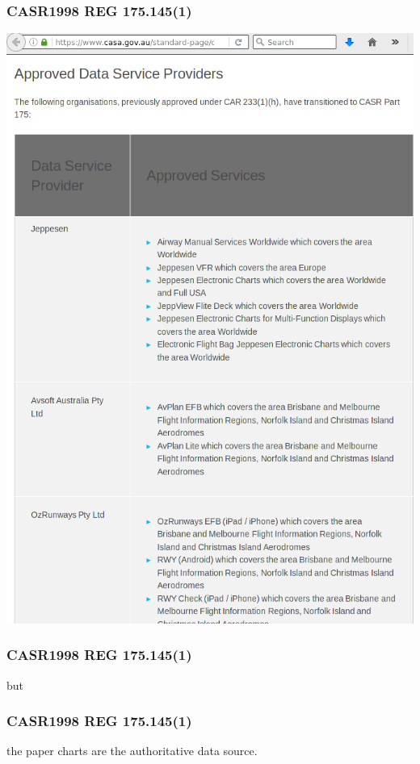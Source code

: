 \begin{frame}
\frametitle{CASR1998 REG 175.145(1)}
\begin{center}
\includegraphics[height=0.8\textheight]{image/casa-approved-data-service-providers.png}
\end{center}
\end{frame}

\begin{frame}
\frametitle{CASR1998 REG 175.145(1)}
\large
\begin{center}
but
\end{center}
\end{frame}

\begin{frame}
\frametitle{CASR1998 REG 175.145(1)}
\large
\begin{center}
the paper charts are the authoritative data source.
\end{center}
\end{frame}

